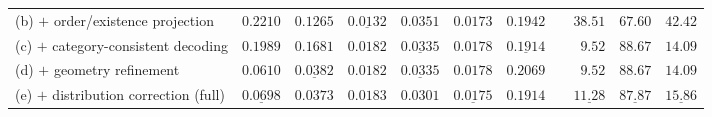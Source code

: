 \begin{table}[t]
\begin{tabular}{lrrrrrrcrrr}
(b) $+$ order/existence projection & $0.2210$ & $0.1265$ & $\underline{0.0132}$ & $0.0351$ & $\mathbf{0.0173}$ & $0.1942$ & & $38.51$ & $67.60$ & $42.42$ \\
(c) $+$ category-consistent decoding & $0.1989$ & $0.1681$ & $0.0182$ & $\underline{0.0335}$ & $0.0178$ & $\underline{0.1914}$ & & $\mathbf{9.52}$ & $\mathbf{88.67}$ & $\mathbf{14.09}$ \\
(d) $+$ geometry refinement & $\mathbf{0.0610}$ & $\underline{0.0382}$ & $0.0182$ & $\underline{0.0335}$ & $0.0178$ & $0.2069$ & & $\mathbf{9.52}$ & $\mathbf{88.67}$ & $\mathbf{14.09}$ \\
(e) $+$ distribution correction (full) & $\underline{0.0698}$ & $\mathbf{0.0373}$ & $0.0183$ & $\mathbf{0.0301}$ & $\underline{0.0175}$ & $0.1914$ & & $\underline{11.28}$ & $\underline{87.87}$ & $\underline{15.86}$ \\
\bottomrule
\end{tabular}
\end{table}
